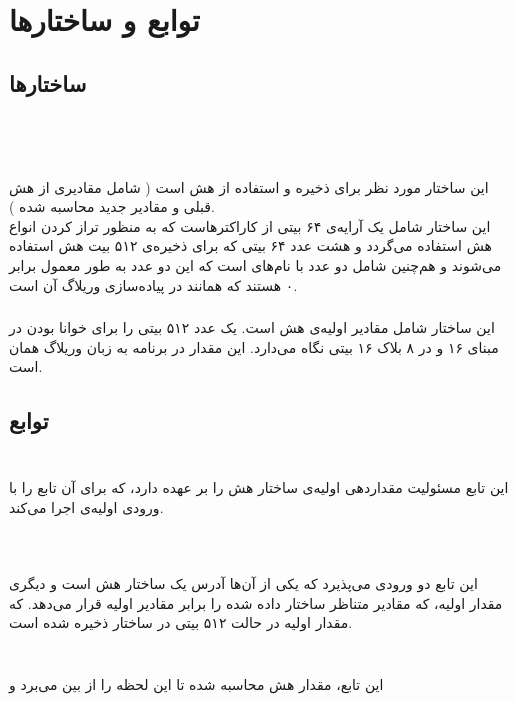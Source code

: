 \chapter{توابع و ساختارها}

\section{ \textbf{ساختارها}}
\\
\\

\subsection{}
\label{subsec:sph-skein-big-context}
این ساختار مورد نظر برای ذخیره و استفاده از هش است (‌ شامل مقادیری از هش قبلی و مقادیر جدید محاسبه شده ). \\ این ساختار شامل یک آرایه‌ی ۶۴ بیتی از کاراکترهاست که به منظور تراز کردن انواع هش استفاده می‌گردد و  هشت عدد ۶۴ بیتی  که برای ذخیره‌ی ۵۱۲ بیت هش  استفاده می‌شوند  و هم‌چنین شامل دو عدد با نام‌های  است که این دو عدد به طور معمول برابر ۰ هستند که همانند  در پیاده‌سازی وریلاگ آن است.



\subsection{}
\label{subsec:IV512}
این ساختار شامل مقادیر اولیه‌ی هش است. یک عدد ۵۱۲ بیتی را برای خوانا بودن در مبنای ۱۶ و در ۸ بلاک ۱۶ بیتی نگاه می‌دارد. این مقدار در برنامه‌ به زبان وریلاگ همان  است.

\section{ توابع}

\subsection{}\\
\label{subsec:sph-skein512-init}
این تابع مسئولیت مقداردهی اولیه‌ی ساختار هش را بر عهده دارد، که برای آن تابع \hyperref[subsec:skein-big-init]{} را با ورودی‌ اولیه‌ی  اجرا می‌کند.
\subsection{}\\
\label{subsec:skein-big-init}

این تابع دو ورودی می‌پذیرد که یکی از آن‌ها آدرس یک ساختار هش است و دیگری مقدار اولیه، که مقادیر متناظر ساختار داده شده را برابر مقادیر اولیه قرار می‌دهد.
که مقدار اولیه در حالت ۵۱۲ بیتی در ساختار  ذخیره شده ‌است.

\subsection{}\\
\label{subsec:sph-skein512}
این تابع، مقدار هش محاسبه شده تا این لحظه را از بین می‌برد و 